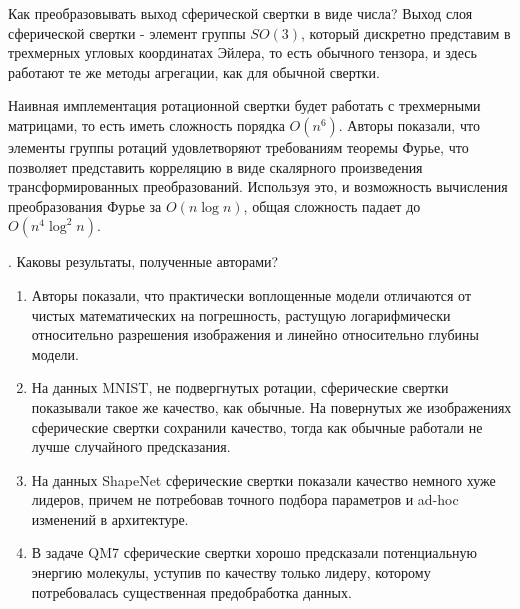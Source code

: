 \documentclass[10pt]{article}
\begin{document}
Как преобразовывать выход сферической свертки в виде числа? Выход слоя сферической свертки - элемент группы $SO(3)$, который дискретно представим в трехмерных угловых координатах Эйлера, то есть обычного тензора, и здесь работают те же методы агрегации, как для обычной свертки.

Наивная имплементация ротационной свертки будет работать с трехмерными матрицами, то есть иметь сложность порядка $O(n^6)$.  Авторы показали, что элементы группы ротаций удовлетворяют требованиям теоремы Фурье, что позволяет представить корреляцию в виде скалярного произведения трансформированных преобразований. Используя это, и возможность вычисления преобразования Фурье за $O(n\log n)$, общая сложность падает до $O(n^4 \log^2 n)$.

. Каковы результаты, полученные авторами?
\medskip

\begin{enumerate}
\item Авторы показали, что практически воплощенные модели отличаются от чистых математических на погрешность, растущую логарифмически относительно разрешения изображения и линейно относительно глубины модели.
\item На данных MNIST, не подвергнутых ротации, сферические свертки показывали такое же качество, как обычные. На повернутых же изображениях сферические свертки сохранили качество, тогда как обычные работали не лучше случайного предсказания.
\item На данных ShapeNet сферические свертки показали качество немного хуже лидеров, причем не потребовав точного подбора параметров и ad-hoc изменений в архитектуре.
\item В задаче QM7 сферические свертки хорошо предсказали потенциальную энергию молекулы, уступив по качеству только лидеру, которому потребовалась существенная предобработка данных.
\end{enumerate}
	
\end{document}
